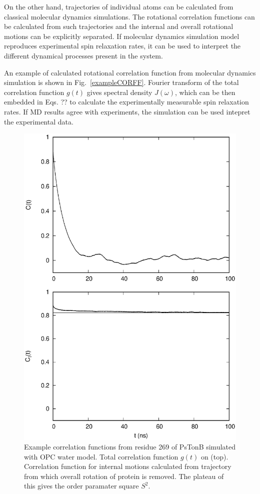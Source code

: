 \documentclass[pre,aps,floatfix,authordate1-4,twocolumn]{revtex4-1}
\begin{document}
On the other hand, trajectories of individual atoms can be calculated
from classical molecular dynamics simulations. The rotational
correlation functions can be calculated from such trajectories and
the internal and overall rotational motions can be explicitly
separated. If molecular dynamics simulation model reproduces
experimental spin relaxation rates, it can be used to interpret
the different dynamical processes present in the system.

An example of calculated rotational correlation function from
molecular dynamics simulation is shown in Fig.~\ref{exampleCORFF}.
Fourier transform of the total correlation function $g(t)$ gives
spectral density $J(\omega)$, which can be then embedded in Eqs. ??
to calculate the experimentally measurable spin relaxation rates.
If MD results agree with experiments, the simulation can be used
intepret the experimental data.
\begin{figure}[!h]
  \includegraphics[width=13cm]{../Figs/exampleCORRF.eps}%
  \caption{Example correlation functions from residue 269 of PsTonB simulated with OPC water model.
    Total correlation function $g(t)$ on (top). Correlation function for internal motions
    calculated from trajectory from which overall rotation of protein is removed.
    The plateau of this gives the order paramater square $S^2$.
    \label{exampleCORRF}}%
\end{figure}
\end{document}
